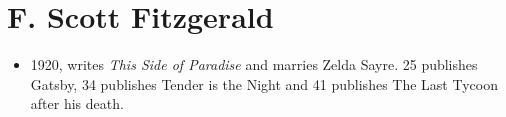 \documentclass[10pt]{article}
\begin{document}
\section{F. Scott Fitzgerald}
\begin{itemize}
	\item 1920, writes \textit{This Side of Paradise} and marries Zelda 
		Sayre.  25 publishes Gatsby, 34 publishes Tender is the Night 
		and 41 publishes The Last Tycoon after his death.
\end{itemize}
\end{document}
